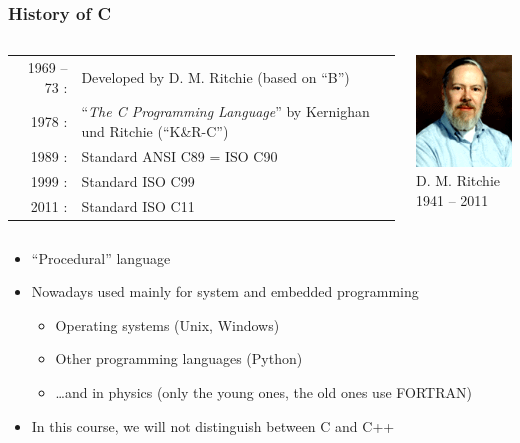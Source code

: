 \documentclass{slides}
\begin{document}
\begin{frame}
  \frametitle{History of C}
  \begin{columns}[c,onlytextwidth]
    \begin{tabular}{r<{:}p{}}
      1969 -- 73 & Developed by D. M. Ritchie (based on ``B'')\\
      1978 & ``\emph{The C Programming Language}'' by Kernighan und Ritchie (``K\&R-C'')\\
      1989 & Standard ANSI C89 = ISO C90\\
      1999 & Standard ISO C99\\
      2011 & Standard ISO C11
    \end{tabular}

    \centering
    \includegraphics[height=0.25\textheight]{ritchie}\\
    {\small D. M. Ritchie\\1941 -- 2011}
  \end{columns}
  \vspace{0.5em}

  \begin{itemize}
  \item ``Procedural'' language
  \item Nowadays used mainly for system and embedded programming
    \begin{itemize}
    \item Operating systems (\eg Unix, Windows)
    \item Other programming languages (\eg Python)
    \item \dots and in physics (only the young ones, the old ones use FORTRAN)
    \end{itemize}
  \item In this course, we will not distinguish between C and C++
  \end{itemize}
\end{frame}
\end{document}
